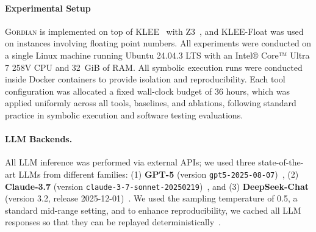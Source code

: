\documentclass[acmsmall]{acmart}
\newcommand{\rev}[1]{\textcolor{red}{#1}}
\newcommand{\rev}[1]{#1}
\newcommand{\projName}{\textsc{Gordian}\xspace}
\theoremstyle{definition}
\begin{document}
\paragraph*{Experimental Setup} \projName is implemented on top of KLEE~\cite{klee} with Z3~\cite{de2008z3}, and KLEE-Float was used on instances involving floating point numbers. All experiments were conducted on a single Linux machine running Ubuntu 24.04.3 LTS with an Intel® Core™ Ultra 7 258V CPU and 32~GiB of RAM. All symbolic execution runs were conducted inside Docker containers to provide isolation and reproducibility. Each tool configuration was allocated a fixed wall-clock budget of 36 hours, which was applied uniformly across all tools, baselines, and ablations, following standard practice in symbolic execution and software testing evaluations.

\paragraph*{LLM Backends.} All LLM inference was performed via external APIs; we used three state-of-the-art LLMs from different families: (1) \textbf{GPT-5} (version \texttt{gpt5-2025-08-07})~\cite{openai_gpt5}, (2) \textbf{Claude-3.7} (version \texttt{claude-3-7-sonnet-20250219})~\cite{anthropicclaude}, and (3) \textbf{DeepSeek-Chat} (version 3.2, release 2025-12-01)~\cite{deepseekv3}. We used the sampling temperature of 0.5, a standard mid-range setting, and to enhance reproducibility, we cached all LLM responses so that they can be replayed deterministically~\cite{dai2025statisticalindependenceawarecaching}.

\end{document}
